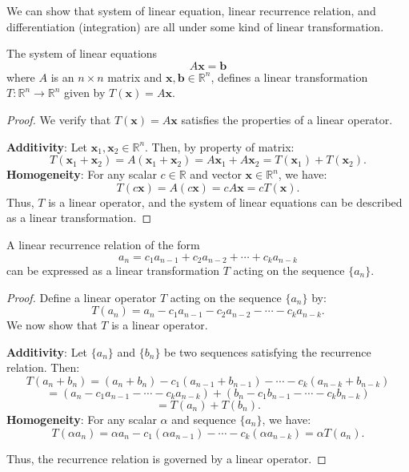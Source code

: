 \documentclass[12pt,a4paper]{article}
\begin{document}
We can show that system of linear equation, linear recurrence relation, and differentiation (integration) are all under some kind of linear transformation.

\begin{proposition}
The system of linear equations
\[
A \mathbf{x} = \mathbf{b}
\]
where \(A\) is an \(n \times n\) matrix and \(\mathbf{x}, \mathbf{b} \in \mathbb{R}^n\), defines a linear transformation \(T: \mathbb{R}^n \to \mathbb{R}^n\) given by \(T(\mathbf{x}) = A \mathbf{x}\).
\end{proposition}

\begin{proof}
We verify that \(T(\mathbf{x}) = A \mathbf{x}\) satisfies the properties of a linear operator.

\textbf{Additivity}: Let \(\mathbf{x}_1, \mathbf{x}_2 \in \mathbb{R}^n\). Then, by property of matrix:
\[
T(\mathbf{x}_1 + \mathbf{x}_2) = A (\mathbf{x}_1 + \mathbf{x}_2) = A \mathbf{x}_1 + A \mathbf{x}_2 = T(\mathbf{x}_1) + T(\mathbf{x}_2).
\]
\textbf{Homogeneity}: For any scalar \(c \in \mathbb{R}\) and vector \(\mathbf{x} \in \mathbb{R}^n\), we have:
\[
T(c \mathbf{x}) = A (c \mathbf{x}) = c A \mathbf{x} = c T(\mathbf{x}).
\]
Thus, \(T\) is a linear operator, and the system of linear equations can be described as a linear transformation.
\end{proof}

\begin{proposition}
A linear recurrence relation of the form
\[
a_n = c_1 a_{n-1} + c_2 a_{n-2} + \cdots + c_k a_{n-k}
\]
can be expressed as a linear transformation \(T\) acting on the sequence \(\{a_n\}\).
\end{proposition}

\begin{proof}
Define a linear operator \(T\) acting on the sequence \(\{a_n\}\) by:
\[
T(a_n) = a_n - c_1 a_{n-1} - c_2 a_{n-2} - \cdots - c_k a_{n-k}.
\]
We now show that \(T\) is a linear operator.

\textbf{Additivity}: Let \(\{a_n\}\) and \(\{b_n\}\) be two sequences satisfying the recurrence relation. Then:
\[
T(a_n + b_n) = (a_n + b_n) - c_1 (a_{n-1} + b_{n-1}) - \cdots - c_k (a_{n-k} + b_{n-k})
\]
\[
= \left( a_n - c_1 a_{n-1} - \cdots - c_k a_{n-k} \right) + \left( b_n - c_1 b_{n-1} - \cdots - c_k b_{n-k} \right)
\]
\[
= T(a_n) + T(b_n).
\]
\textbf{Homogeneity}: For any scalar \( \alpha \) and sequence \(\{a_n\}\), we have:
\[
T(\alpha a_n) = \alpha a_n - c_1 (\alpha a_{n-1}) - \cdots - c_k (\alpha a_{n-k}) = \alpha T(a_n).
\]

Thus, the recurrence relation is governed by a linear operator.
\end{proof}
\end{document}
